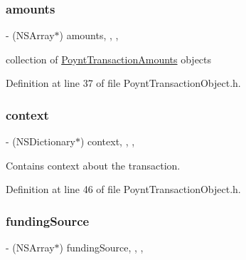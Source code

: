 \subsubsection{\texorpdfstring{amounts}{amounts}}
{\footnotesize\ttfamily -\/ (N\+S\+Array$\ast$) amounts\hspace{0.3cm}{\ttfamily [read]}, {\ttfamily [write]}, {\ttfamily [nonatomic]}, {\ttfamily [strong]}}



collection of \hyperlink{interface_poynt_transaction_amounts}{Poynt\+Transaction\+Amounts} objects 



Definition at line 37 of file Poynt\+Transaction\+Object.\+h.

\hypertarget{interface_poynt_transaction_object_a97674af3143e04f09bbc6590dab812d7}{}\label{interface_poynt_transaction_object_a97674af3143e04f09bbc6590dab812d7} 
\subsubsection{\texorpdfstring{context}{context}}
{\footnotesize\ttfamily -\/ (N\+S\+Dictionary$\ast$) context\hspace{0.3cm}{\ttfamily [read]}, {\ttfamily [write]}, {\ttfamily [nonatomic]}, {\ttfamily [strong]}}



Contains context about the transaction. 



Definition at line 46 of file Poynt\+Transaction\+Object.\+h.

\hypertarget{interface_poynt_transaction_object_ab4cac3360e86d21570d89915c99e6943}{}\label{interface_poynt_transaction_object_ab4cac3360e86d21570d89915c99e6943} 
\subsubsection{\texorpdfstring{funding\+Source}{fundingSource}}
{\footnotesize\ttfamily -\/ (N\+S\+Array$\ast$) funding\+Source\hspace{0.3cm}{\ttfamily [read]}, {\ttfamily [write]}, {\ttfamily [nonatomic]}, {\ttfamily [strong]}}



